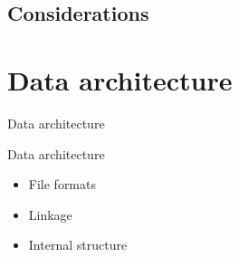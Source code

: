 \documentclass{beamer}
\begin{document}
\subsection{Considerations}
\begin{frame}
\end{frame}




\section{Data architecture}

\begin{frame}[plain]
	Data architecture
\end{frame}

\begin{frame}{Data architecture}
	
	\begin{itemize}
		\item File formats
		\item Linkage
		\item Internal structure
	\end{itemize}
\end{frame}
\end{document}
